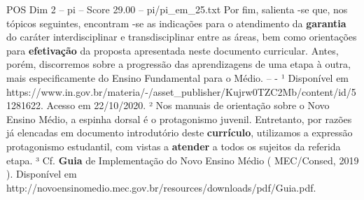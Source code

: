 \begin{textsample}{POS Dim 2 – pi – Score 29.00 – pi/pi\_em\_25.txt}
Por fim, salienta -se que, nos tópicos seguintes, encontram -se as indicações para o atendimento da \textbf{garantia} do caráter interdisciplinar e transdisciplinar entre as áreas, bem como orientações para \textbf{efetivação} da proposta apresentada neste documento curricular.
Antes, porém, discorremos sobre a progressão das aprendizagens de uma etapa à outra, mais especificamente do Ensino Fundamental para o Médio. -- - ¹ Disponível em https://www.in.gov.br/materia/-/asset\_publisher/Kujrw0TZC2Mb/content/id/51281622.
Acesso em 22/10/2020. ² Nos manuais de orientação sobre o Novo Ensino Médio, a espinha dorsal é o protagonismo juvenil.
Entretanto, por razões já elencadas em documento introdutório deste \textbf{currículo}, utilizamos a expressão protagonismo estudantil, com vistas a \textbf{atender} a todos os sujeitos da referida etapa. ³ Cf. \textbf{Guia} de Implementação do Novo Ensino Médio ( MEC/Consed, 2019 ).
Disponível em http://novoensinomedio.mec.gov.br/resources/downloads/pdf/Guia.pdf.

\end{textsample}
